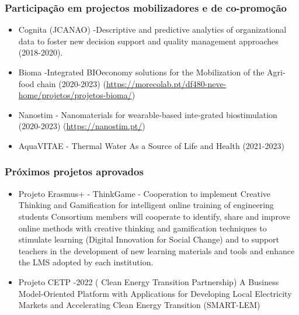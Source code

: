 \documentclass[11pt]{article}
\begin{document}
\subsubsection{Participação em projectos mobilizadores e de co-promoção}
\begin{itemize}
\item {Cognita (JCANAO) -Descriptive and predictive analytics of organizational data to foster new decision support and quality management approaches (2018-2020).}
\item {Bioma -Integrated BIOeconomy solutions for the Mobilization of the Agri-food chain (2020-2023) (\url{https://morecolab.pt/df480-neve-home/projetos/projetos-bioma/})}
\item {Nanostim - Nanomaterials for wearable-based inte-grated biostimulation (2020-2023) (\url{https://nanostim.pt/})}
\item {AquaVITAE - Thermal Water As a Source of Life and Health (2021-2023)}
\end{itemize}

\subsubsection{Próximos projetos aprovados}
\begin{itemize}
\item {Projeto Erasmus+ - ThinkGame - Cooperation to implement Creative Thinking and Gamification for intelligent online training of engineering students Consortium members will cooperate to identify, share and improve online methods with creative thinking and gamification techniques to stimulate learning (Digital Innovation for Social Change) and to support teachers in the development of new learning materials and tools and enhance the LMS adopted by each institution. }
\item {Projeto CETP -2022 ( Clean Energy Transition Partnership) A Business Model-Oriented Platform with Applications for Developing Local Electricity Markets and Accelerating Clean Energy Transition (SMART-LEM) }
\end{itemize}
\end{document}
